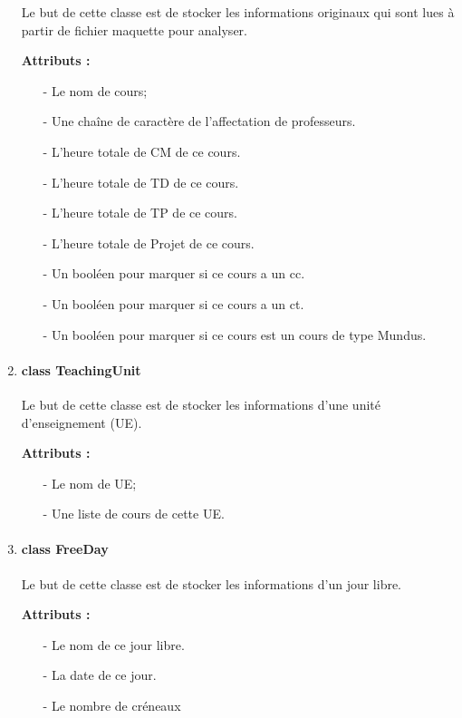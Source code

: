 \documentclass{polytech/polytech}
\begin{document}
\begin{enumerate}
			Le but de cette classe est de stocker les informations originaux qui sont lues à partir de fichier maquette pour analyser.

			\textbf{Attributs :}
				\begin{itemize}
					\item[-] Le nom de cours;
					\item[-] Une chaîne de caractère de l'affectation de professeurs.
					\item[-] L'heure totale de CM de ce cours.
					\item[-] L'heure totale de TD de ce cours.
					\item[-] L'heure totale de TP de ce cours.
					\item[-] L'heure totale de Projet de ce cours.
					\item[-] Un booléen pour marquer si ce cours a un cc.
					\item[-] Un booléen pour marquer si ce cours a un ct.
					\item[-] Un booléen pour marquer si ce cours est un cours de type Mundus.
				\end{itemize}

			\item \paragraph{class TeachingUnit}

			Le but de cette classe est de stocker les informations d'une unité d'enseignement (UE).

			\textbf{Attributs :}
				\begin{itemize}
					\item[-] Le nom de UE;
					\item[-] Une liste de cours de cette UE.
				\end{itemize}

			\item \paragraph{class FreeDay}

			Le but de cette classe est de stocker les informations d'un jour libre.

			\textbf{Attributs :}
				\begin{itemize}
					\item[-] Le nom de ce jour libre.
					\item[-] La date de ce jour.
					\item[-] Le nombre de créneaux
				\end{itemize}


\end{enumerate}
\end{document}
